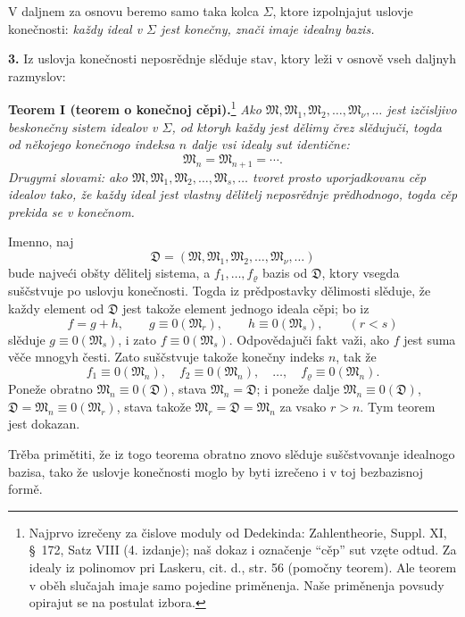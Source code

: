 \documentclass[11pt]{article}
\newcommand{\ideal}[1]{\mathfrak{#1}}
\begin{document}
V daljnem za osnovu beremo samo taka kolca \(\Sigma\), ktore izpolnjajut uslovje konečnosti: \emph{každy ideal v \(\Sigma\) jest konečny, znači imaje idealny bazis.}

\textbf{3.} Iz uslovja konečnosti neposrědnje slěduje stav, ktory leži v osnově vseh daljnyh razmyslov:

\textbf{Teorem I (teorem o konečnoj cěpi).}\footnote{Najprvo izrečeny za čislove moduly od Dedekinda: Zahlentheorie, Suppl. XI, \S~172, Satz VIII (4. izdanje); naš dokaz i označenje ``cěp'' sut vzęte odtud. Za idealy iz polinomov pri Laskeru, cit. d., str. 56 (pomočny teorem). Ale teorem v oběh slučajah imaje samo pojedine priměnenja. Naše priměnenja povsudy opirajut se na postulat izbora.}
\emph{Ako \(\ideal M,\ideal M_1,\ideal M_2,\ldots,\ideal M_\nu,\ldots\) jest izčisljivo beskonečny sistem idealov v \(\Sigma\), od ktoryh každy jest dělimy črez slědujuči, togda od někojego konečnogo indeksa \(n\) dalje vsi idealy sut identične:
\[
 \ideal M_n=\ideal M_{n+1}=\cdots.
\]
Drugymi slovami: ako \(\ideal M,\ideal M_1,\ideal M_2,\ldots,\ideal M_s,\ldots\) tvoret prosto uporjadkovanu cěp idealov tako, že každy ideal jest vlastny dělitelj neposrědnje prědhodnogo, togda cěp prekida se v konečnom.}

Imenno, naj
\[
 \ideal D=(\ideal M,\ideal M_1,\ideal M_2,\ldots,\ideal M_\nu,\ldots)
\]
bude najveći obšty dělitelj sistema, a \(f_1,\ldots,f_\varrho\) bazis od \(\ideal D\), ktory vsegda suščstvuje po uslovju konečnosti. Togda iz prědpostavky dělimosti slěduje, že každy element od \(\ideal D\) jest takože element jednogo ideala cěpi; bo iz
\[
 f=g+h,\qquad g\equiv0(\ideal M_r),\qquad h\equiv0(\ideal M_s),\qquad (r<s)
\]
slěduje \(g\equiv0(\ideal M_s)\), i zato \(f\equiv0(\ideal M_s)\). Odpovědajuči fakt važi, ako \(f\) jest suma věče mnogyh česti. Zato suščstvuje takože konečny indeks \(n\), tak že
\[
 f_1\equiv0(\ideal M_n),\quad f_2\equiv0(\ideal M_n),\quad\ldots,\quad f_\varrho\equiv0(\ideal M_n).
\]
Poneže obratno \(\ideal M_n\equiv0(\ideal D)\), stava \(\ideal M_n=\ideal D\); i poneže dalje \(\ideal M_n\equiv0(\ideal D)\), \(\ideal D=\ideal M_n\equiv0(\ideal M_r)\), stava takože \(\ideal M_r=\ideal D=\ideal M_n\) za vsako \(r>n\). Tym teorem jest dokazan.

Trěba primětiti, že iz togo teorema obratno znovo slěduje suščstvovanje idealnogo bazisa, tako že uslovje konečnosti moglo by byti izrečeno i v toj bezbazisnoj formě.

\clearpage
\end{document}
